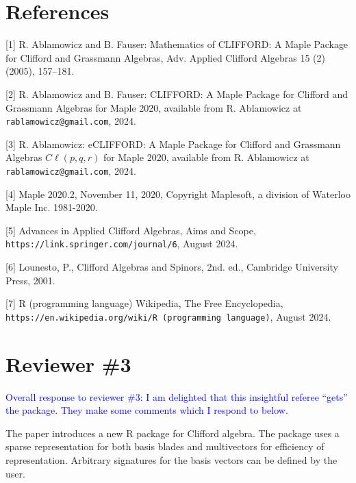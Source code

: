 \documentclass{article}
\newcommand{\cliff}[1]{\ensuremath{C\ell\left(#1\right)}}
\begin{document}
\section*{References}

\begin{description}
\item{[1]} R. Ablamowicz and B. Fauser: Mathematics of CLIFFORD: A Maple Package for Clifford and
Grassmann Algebras, Adv. Applied Clifford Algebras 15 (2) (2005), 157–181.\\
\item{[2]} R. Ablamowicz and B. Fauser: CLIFFORD: A Maple Package for Clifford and Grassmann
Algebras for Maple 2020, available from R. Ablamowicz at {\tt rablamowicz@gmail.com}, 2024.\\
\item{[3]} R. Ablamowicz: eCLIFFORD: A Maple Package for Clifford and Grassmann Algebras \cliff{p, q, r}
for Maple 2020, available from R. Ablamowicz at {\tt rablamowicz@gmail.com}, 2024.\\
\item{[4]} Maple 2020.2, November 11, 2020, Copyright Maplesoft, a division of Waterloo Maple Inc.
1981-2020.\\
\item{[5]} Advances in Applied Clifford Algebras, Aims and Scope,
{\tt https://link.springer.com/journal/6}, August 2024.\\
\item{[6]} Lounesto, P., Clifford Algebras and Spinors, 2nd. ed., Cambridge University Press, 2001.
\item{[7]} R (programming language) Wikipedia, The Free Encyclopedia,
{\tt https://en.wikipedia.org/wiki/R (programming language)}, August 2024.
\end{description}


\section*{Reviewer \#3}

\textcolor{blue}{Overall response to reviewer \#3: I am delighted that
  this insightful referee ``gets'' the package.  They make some
  comments which I respond to below.}


The paper introduces a new R package for Clifford algebra. The package
uses a sparse representation for both basis blades and multivectors
for efficiency of representation.  Arbitrary signatures for the basis
vectors can be defined by the user.
\end{document}
